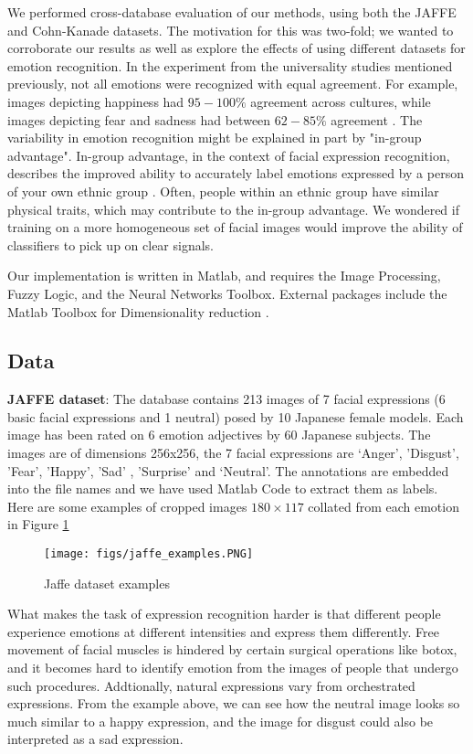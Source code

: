 \documentclass[10pt,twocolumn,letterpaper]{article}
\begin{document}
We performed cross-database evaluation of our methods, using both the JAFFE and Cohn-Kanade datasets. The motivation for this was two-fold; we wanted to corroborate our results as well as explore the effects of using different datasets for emotion recognition. In the experiment from the universality studies mentioned previously, not all emotions were recognized with equal agreement. For example, images depicting happiness had $95-100\%$ agreement across cultures, while images depicting fear and sadness had between $62-85\%$ agreement \cite{universality_studies}. The variability in emotion recognition might be explained in part by "in-group advantage". In-group advantage, in the context of facial expression recognition, describes the improved ability to accurately label emotions expressed by a person of your own ethnic group \cite{universality}. Often, people within an ethnic group have similar physical traits, which may contribute to the in-group advantage. We wondered if training on a more homogeneous set of facial images would improve the ability of classifiers to pick up on clear signals.

Our implementation is written in Matlab, and requires the Image Processing, Fuzzy Logic, and the Neural Networks Toolbox. External packages include the Matlab Toolbox for Dimensionality reduction \cite{drtoolbox}.

\subsection{Data}
\textbf{JAFFE dataset}: The database \cite{jaffe} contains 213 images of 7 facial expressions (6 basic facial expressions and 1 neutral) posed by 10 Japanese female models. Each image has been rated on 6 emotion adjectives by 60 Japanese subjects. The images are of dimensions 256x256, the 7 facial expressions are ‘Anger’, ’Disgust’, ’Fear’, ’Happy’, ’Sad’ , ’Surprise’ and ‘Neutral’.  The annotations are embedded into the file names and we have used Matlab Code to extract them as labels. Here are some examples of cropped images $180\times117$ collated from each emotion in Figure \ref{fig:jaffe_examples}

\begin{figure}[h]
\texttt{[image: figs/jaffe\_examples.PNG]}
\caption{Jaffe dataset examples}
\label{fig:jaffe_examples}
\end{figure}

What makes the task of expression recognition harder is that different people experience emotions at different intensities and express them differently. Free movement of facial muscles is hindered by certain surgical operations like botox, and it becomes hard to identify emotion from the images of people that undergo such procedures. Addtionally, natural expressions vary from orchestrated expressions. From the example above, we can see how the neutral image looks so much similar to a happy expression, and the image for disgust could also be interpreted as a sad expression.
\end{document}
